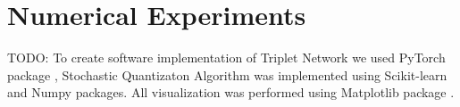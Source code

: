 \section{Numerical Experiments}

TODO: To create software implementation of Triplet Network we used PyTorch package \cite{Ansel_2024}, Stochastic Quantizaton Algorithm was implemented using Scikit-learn \cite{Pedregosa_2011} and Numpy \cite{harris2020array} packages. All visualization was performed using Matplotlib package \cite{Hunter_2007}.
